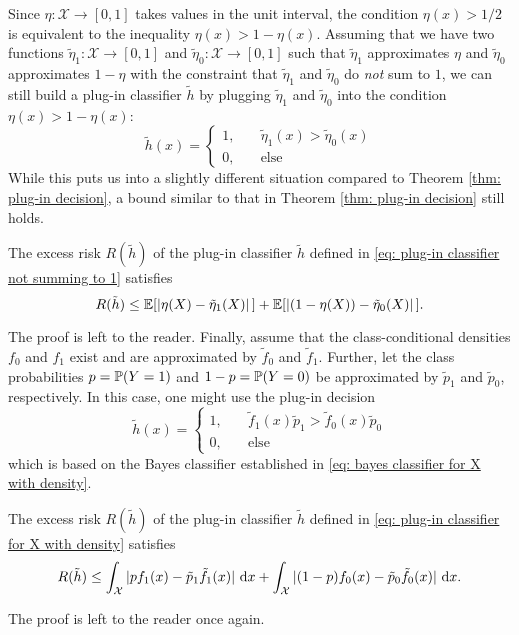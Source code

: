 Since $\eta \colon \mathcal{X} \to [0, 1]$ takes values in the unit interval, the condition $\eta(x) > 1/2$ is equivalent to the inequality $\eta(x) > 1 - \eta(x)$. Assuming that we have two functions $\tilde{\eta}_1 \colon \mathcal{X} \to [0, 1]$ and $\tilde{\eta}_0 \colon \mathcal{X} \to [0, 1]$ such that $\tilde{\eta}_1$ approximates $\eta$ and $\tilde{\eta}_0$ approximates $1 - \eta$ with the constraint that $\tilde{\eta}_1$ and $\tilde{\eta}_0$ do \emph{not} sum to $1$, we can still build a plug-in classifier $\tilde{h}$ by plugging $\tilde{\eta}_1$ and $\tilde{\eta}_0$ into the condition $\eta(x) > 1 - \eta(x)$:
\begin{equation}
\label{eq: plug-in classifier not summing to 1}
    \tilde{h}(x) = \begin{cases}
        1, \quad & \tilde{\eta}_1(x) > \tilde{\eta}_0(x) \\
        0, \quad & \text{else}
    \end{cases}
\end{equation}
While this puts us into a slightly different situation compared to Theorem \ref{thm: plug-in decision}, a bound similar to that in Theorem \ref{thm: plug-in decision} still holds.

\begin{theorem}
The excess risk $R(\tilde{h})$ of the plug-in classifier $\tilde{h}$ defined in \eqref{eq: plug-in classifier not summing to 1} satisfies
\[
    R(\tilde{h}) \leq \operatorname{\mathbb{E}}[\abs*{\eta(X) - \tilde{\eta}_1(X)}] + \operatorname{\mathbb{E}}[\abs*{(1 - \eta(X)) - \tilde{\eta}_0(X)}].
\]
\end{theorem}

The proof is left to the reader. Finally, assume that the class-conditional densities $f_0$ and $f_1$ exist and are approximated by $\tilde{f}_0$ and $\tilde{f}_1$. Further, let the class probabilities $p = \operatorname{\mathbb{P}}(Y = 1)$ and $1 - p = \operatorname{\mathbb{P}}(Y = 0)$ be approximated by $\tilde{p}_1$ and $\tilde{p}_0$, respectively. In this case, one might use the plug-in decision
\begin{equation}
\label{eq: plug-in classifier for X with density}
    \tilde{h}(x) = \begin{cases}
        1, \quad & \tilde{f}_1(x) \tilde{p}_1 > \tilde{f}_0(x) \tilde{p}_0 \\
        0, \quad & \text{else}
    \end{cases}
\end{equation}
which is based on the Bayes classifier established in \eqref{eq: bayes classifier for X with density}.

\begin{proposition}
The excess risk $R(\tilde{h})$ of the plug-in classifier $\tilde{h}$ defined in \eqref{eq: plug-in classifier for X with density} satisfies
\[
    R(\tilde{h}) \leq \int_{\mathcal{X}} \abs*{pf_1(x) - \tilde{p}_1\tilde{f}_1(x) } \, \mathrm{d}x + \int_{\mathcal{X}} \abs*{(1 - p)f_0(x) - \tilde{p}_0\tilde{f}_0(x)} \, \mathrm{d}x.
\]
\end{proposition}

The proof is left to the reader once again.
